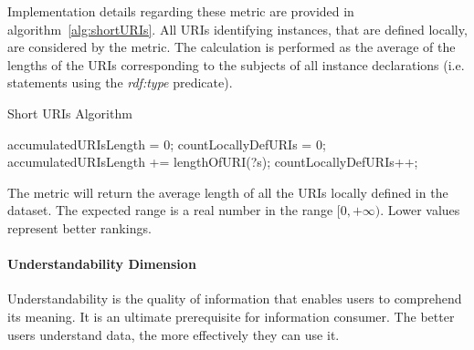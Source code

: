 Implementation details regarding these metric are provided in algorithm~\ref{alg:shortURIs}. All URIs identifying instances, that are defined locally, are considered by the metric. The calculation is performed as the average of the lengths of the URIs corresponding to the subjects of all instance declarations (i.e. statements using the \textit{rdf:type} predicate).
\begin{algorithm}
\caption{Short URIs Algorithm} \label{alg:shortURIs}
\begin{algorithmic}[1]
\State accumulatedURIsLength = 0;
\State countLocallyDefURIs = 0;
\EndProcedure
{}
\State accumulatedURIsLength += lengthOfURI(?s);
\State countLocallyDefURIs++;
\EndIf ~\\
\EndProcedure
\end{algorithmic}
\end{algorithm}
The metric will return the average length of all the URIs locally defined in the dataset. The expected range is a real number in the range $[0, +\infty)$. Lower values represent better rankings.


\paragraph{Understandability Dimension}
Understandability is the quality of information that enables users to comprehend its meaning. 
It is an ultimate prerequisite for information consumer. 
The better users understand data, the more effectively they can use it. 

